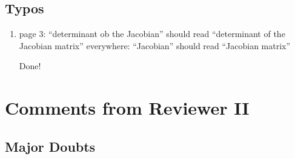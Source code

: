 \documentclass{article}
\begin{document}
\subsection*{Typos}
\begin{enumerate}
    \item page 3: ``determinant ob the Jacobian'' should read ``determinant of the Jacobian matrix'' everywhere: ``Jacobian'' should read ``Jacobian matrix''
    
    {\color{mred} Done!}
\end{enumerate}

\section{Comments from Reviewer II}

\subsection*{Major Doubts}
\end{document}
